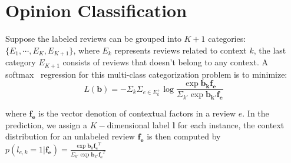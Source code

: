 \documentclass[preprint,12pt]{elsarticle}
\begin{document}
\section{Opinion Classification}\label{sec:classifier}

Suppose the labeled reviews can be grouped into $K+1$ categories: $\{E_1,\cdots,E_K,E_{K+1}\}$, where $E_k$ represents reviews related to context $k$, the last category $E_{K+1}$ consists of reviews that doesn't belong to any context. A softmax~\cite{Heckerman1997Models} regression for this multi-class categorization problem is to minimize:
\begin{equation}\label{equ:softmax}
  L(\mathbf{b})= -\Sigma_{k}\Sigma_{e\in E^+_k}\log \frac{\exp{\mathbf{b_k}\mathbf{f_e}}}{\Sigma_{k'} \exp{\mathbf{b_{k'}}\mathbf{f_e}}}
\end{equation}

where  $\mathbf{f_e}$ is the vector denotion of contextual factors in a review $e$. In the prediction, we assign a $K-$dimensional label $\mathbf{l}$ for each instance, the context distribution for an unlabeled review $\mathbf{f_e}$ is then computed by $p(l_{e,k}=1|\mathbf{f_e})=\frac{\exp{\mathbf{b}_k\mathbf{f_e}^T}}{\Sigma_{k'}\exp{\mathbf{b}_{k'}\mathbf{f_e}^T}}$
\end{document}
